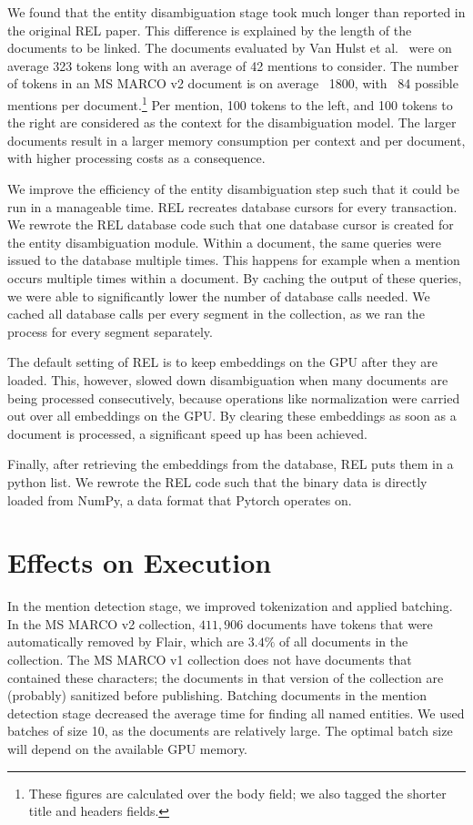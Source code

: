 We found that the entity disambiguation stage took much longer than reported in the original REL paper. This difference is explained by the length of the documents to be linked. The documents evaluated by Van Hulst et al.~\cite{REL} were on average 323 tokens long with an average of 42 mentions to consider. The number of tokens in an MS MARCO v2 document is on average ~1800, with ~84 possible mentions per document.\footnote{These figures are calculated over the body field; we also tagged the shorter title and headers fields.}
Per mention, 100 tokens to the left, and 100 tokens to the right are considered as the context for the disambiguation model. 
The larger documents result in a larger memory consumption per context and per document, with higher processing costs as a consequence.

We improve the efficiency of the entity disambiguation step such that it could be run in a manageable time. REL recreates database cursors for every transaction. We rewrote the REL database code such that one database cursor is created for the entity disambiguation module. 
Within a document, the same queries were issued to the database multiple times. This happens for example when a mention occurs multiple times within a document. By caching the output of these queries, we were able to significantly lower the number of database calls needed. We cached all database calls per every segment in the collection, as we ran the process for every segment separately. 

The default setting of REL is to keep embeddings on the GPU after they are loaded. This, however, slowed down disambiguation when many documents are being processed consecutively, because operations like normalization were carried out over all embeddings on the GPU. By clearing these embeddings as soon as a document is processed, a significant speed up has been achieved.

Finally, after retrieving the embeddings from the database, REL puts them in a python list. We rewrote the REL code such that the binary data is directly loaded from NumPy, a data format that Pytorch operates on. 

\section{Effects on Execution}
In the mention detection stage, we improved tokenization and applied batching. In the MS MARCO v2 collection, $411,906$ documents have tokens that were automatically removed by Flair, which are $3.4\%$ of all documents in the collection. The MS MARCO v1 collection does not have documents that contained these characters; the documents in that version of the collection are (probably) sanitized before publishing.
Batching documents in the mention detection stage decreased the average time for finding all named entities. We used batches of size 10, as the documents are relatively large. The optimal batch size will depend on the available GPU memory.

